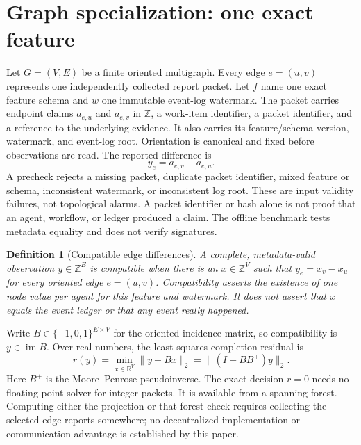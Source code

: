 \documentclass[11pt,a4paper]{article}
\newtheorem{definition}{Definition}
\begin{document}
\section{Graph specialization: one exact feature}\label{sec:model}
Let $G=(V,E)$ be a finite oriented multigraph. Every edge $e=(u,v)$ represents one independently collected report packet. Let $f$ name one exact feature schema and $w$ one immutable event-log watermark. The packet carries endpoint claims $a_{e,u}$ and $a_{e,v}$ in $\mathbb Z$, a work-item identifier, a packet identifier, and a reference to the underlying evidence. It also carries its feature/schema version, watermark, and event-log root. Orientation is canonical and fixed before observations are read. The reported difference is
\begin{equation}\label{eq:edge-difference}
y_e=a_{e,v}-a_{e,u}.
\end{equation}
A precheck rejects a missing packet, duplicate packet identifier, mixed feature or schema, inconsistent watermark, or inconsistent log root. These are input validity failures, not topological alarms. A packet identifier or hash alone is not proof that an agent, workflow, or ledger produced a claim. The offline benchmark tests metadata equality and does not verify signatures.

\begin{definition}[Compatible edge differences]\label{def:compatible-report}
A complete, metadata-valid observation $y\in\mathbb Z^E$ is \emph{compatible} when there is an $x\in\mathbb Z^V$ such that $y_e=x_v-x_u$ for every oriented edge $e=(u,v)$. Compatibility asserts the existence of one node value per agent for this feature and watermark. It does not assert that $x$ equals the event ledger or that any event really happened.
\end{definition}

Write $B\in\{-1,0,1\}^{E\times V}$ for the oriented incidence matrix, so compatibility is $y\in\operatorname{im}B$. Over real numbers, the least-squares completion residual is
\begin{equation}\label{eq:projection}
r(y)=\min_{x\in\mathbb R^V}\|y-Bx\|_2
     =\|(I-BB^+)y\|_2.
\end{equation}
Here $B^+$ is the Moore--Penrose pseudoinverse. The exact decision $r=0$ needs no floating-point solver for integer packets. It is available from a spanning forest. Computing either the projection or that forest check requires collecting the selected edge reports somewhere; no decentralized implementation or communication advantage is established by this paper.
\end{document}
